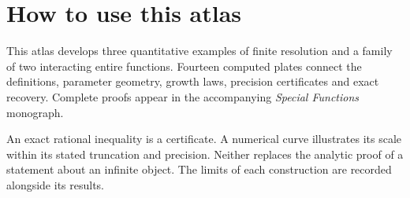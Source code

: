 \documentclass[11pt]{article}
\begin{document}
\section*{How to use this atlas}
This atlas develops three quantitative examples of finite resolution and a family
of two interacting entire functions. Fourteen computed plates connect the definitions,
parameter geometry, growth laws, precision certificates and exact recovery.
Complete proofs appear in the accompanying \emph{Special Functions} monograph.

An exact rational inequality is a certificate. A numerical curve illustrates its
scale within its stated truncation and precision. Neither replaces the analytic
proof of a statement about an infinite object. The limits of each construction
are recorded alongside its results.

\vspace{12pt}
\begingroup\setlength{\parskip}{0pt}\tableofcontents\endgroup
\clearpage{}




\end{document}
